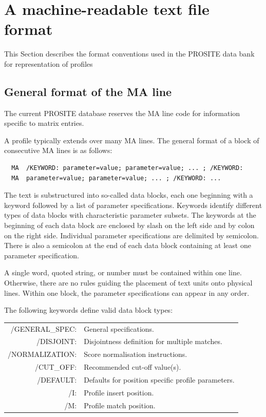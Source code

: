 \documentclass[a4paper,10pt,twoside]{scrartcl}
\begin{document}
  \section{A machine-readable text file format} \label{A machine-readable text file format}
  
  This Section describes the format conventions used in the PROSITE data bank for representation of profiles


  \subsection{General format of the MA line}
  The current PROSITE database reserves the MA line code for information specific to matrix entries.

  A profile typically extends over many MA lines. The general format of a block of consecutive MA lines is as follows:
\begin{verbatim}
  MA  /KEYWORD: parameter=value; parameter=value; ... ; /KEYWORD:
  MA  parameter=value; parameter=value; ... ; /KEYWORD: ...
\end{verbatim}
  The text is substructured into so-called data blocks, each one beginning with a keyword followed by a list of parameter specifications. Keywords
  identify different types of data blocks with characteristic parameter subsets. The keywords at the beginning of each data block are enclosed by
  slash on the left side and by colon on the right side. Individual parameter specifications are delimited by semicolon. There is also a semicolon
  at the end of each data block containing at least one parameter specification.

  A single word, quoted string, or number must be contained within one line. Otherwise, there are no rules guiding the placement of text units onto
  physical lines. Within one block, the parameter specifications can appear in any order.

  The following keywords define valid data block types:
  \begin{center}
  \begin{tabular}{rl}
    /GENERAL\_SPEC: &   General specifications.\\
    /DISJOINT:      &   Disjointness definition for multiple matches.\\
    /NORMALIZATION: &   Score normalisation instructions.\\
    /CUT\_OFF:      &   Recommended cut-off value(s).\\
    /DEFAULT:       &   Defaults for position specific profile parameters.\\
    /I:             &   Profile insert position.\\
    /M:             &   Profile match position.
  \end{tabular}
  \end{center}
\end{document}
